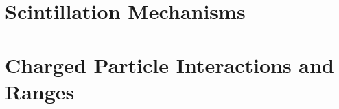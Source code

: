 \section{Scintillation Mechanisms}
\label{sec:ScintMechanics}

\section{Charged Particle Interactions and Ranges}
\label{sec:InteractionsAndRange}


